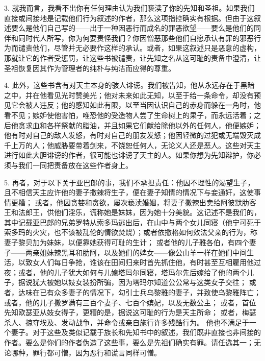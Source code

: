 3. 就我而言，我看不出你有任何理由认为我们亵渎了你的先知和圣祖。如果我们直接或间接地是记载他们行为叙述的作者，那么这项指控确实有根据。但由于这叙述要么是他们自己写的——出于一种因恶行而成名的罪恶欲望——要么是他们的同伴和同时代人所写，你为何要责怪我们？你因憎恶那些他们自愿承认有罪的邪恶行为而谴责他们，尽管并无必要作这样的承认。或者，如果这叙述只是恶意的虚构，那就让它的作者受惩罚，让这些书被谴责，让先知之名从这可耻的责备中澄清，让圣祖恢复因其作为管理者的纯朴与纯洁而应得的尊重。\par

4. 此外，这些书含有对天主本身的骇人诽谤。我们被告知，他从永远存在于黑暗之中，并在他看见光时赞美光；他对未来如此无知，以至于给一条命令，却没有预见它会被人违反；他的感知如此有限，以至当因认识自己的赤身而躲在一角时，他看不见；嫉妒使他害怕，唯恐他的受造物人尝了生命树上的果子，而永远活着；之后他贪求血和各样祭献的脂油，并且如果它们献给除他以外的任何人，他便嫉妒；他有时对自己的敌人发怒，有时对自己的朋友发怒；他因轻微的过犯或无端毁灭成千上万的人；他威胁要带着剑来，不饶恕任何人，无论义人还是恶人。这些对天主进行如此大胆诽谤的作者，很可能也诽谤了天主的人。如果你想为先知辩护，你必须与我们一同把责备放在这些作者身上。\par

5. 再者，对于以下关于亚巴郎的事，我们不承担责任：他因不理性的渴望生子，且不相信天主应许他的妻子撒辣将生子，便在妻子知情的情况下与妾通奸，这使事情更糟； 或者，他因贪婪和贪欲，屡次亵渎婚姻，将妻子撒辣出卖给阿彼默肋客王和法郎王，供他们淫乐，谎称她是妹妹，因为她十分美貌。这记述不是我们的，其中记载亚巴郎的兄弟罗特从索多玛逃出后，在山中与两个女儿同寝（他宁可死于索多玛的火灾，也不该被乱伦的情欲焚烧）；或者依撒格如何效法父亲的行为，称妻子黎贝加为妹妹，以便靠她获得可耻的生计； 或者他的儿子雅各伯，有四个妻子——两亲姐妹辣黑耳和肋阿，以及她们的婢女——像公山羊一样在她们中间生活，以致女人们每日争抢，谁该在田间归来时首先抓住他，有时甚至互相雇用他过夜；或者，他的儿子犹大如何与儿媳塔玛尔同寝，塔玛尔先后嫁给了他的两个儿子，据说犹大被她以妓女装扮所骗，因为塔玛尔知道公公常与这类女子交往； 或者，达味在已有众多妻子的情况下，勾引士兵乌黎雅的妻子，并致使乌黎雅阵亡； 或者，他的儿子撒罗满有三百个妻子、七百个嫔妃，以及无数公主； 或者，首位先知欧瑟亚从妓女得子，更糟的是，据说这可耻的行为是天主所命； 或者，梅瑟杀人、掠夺埃及、发动战争，并命令或亲自施行许多残酷行为。 他也不满足于一个妻子。对于这些及类似记载于族长和先知书中的叙述，我们既非直接也非间接的作者。要么是你们的作者伪造了这些事，要么是先祖们确实有罪。请任选其一；无论哪种，罪行都可憎，因为恶行和谎言同样可憎。\par

